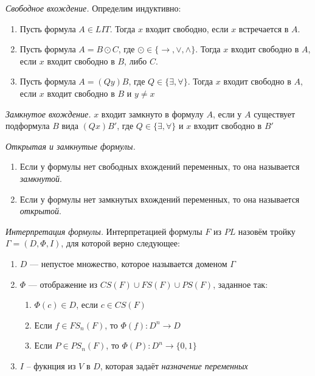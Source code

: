 \begin{definition}
  \emph{Свободное вхождение.} Определим индуктивно: 
  \begin{enumerate}
  	\item Пусть формула $A \in LIT$. Тогда $x$ входит свободно, если $x$ встречается в $A$.
    \item Пусть формула $A = B \odot C$, где $\odot \in \{ \to, \vee, \wedge \}$. Тогда $x$ входит свободно в $A$, если $x$ входит свободно в $B$, либо $C$.
    \item Пусть формула $A = (Qy)B$, где $Q \in \{ \exists, \forall \}$. Тогда $x$ входит свободно в $A$, если $x$ входит свободно в $B$ и $y \neq x$
  \end{enumerate}
\end{definition}

\begin{definition}
  \emph{Замкнутое вхождение.} $x$ входит замкнуто в формулу $A$, если у $A$ существует подформула $B$ вида $(Qx)B'$, где $Q \in \{ \exists, \forall \}$ и $x$ входит свободно в $B'$
\end{definition}

\begin{definition}
  \emph{Открытая и замкнутые формулы.}
    \begin{enumerate}
      \item Если у формулы нет свободных вхождений переменных, то она называется \textit{замкнутой}.
      \item Если у формулы нет замкнутых вхождений переменных, то она называется \textit{открытой}.
    \end{enumerate}
\end{definition}

\begin{definition}
  \emph{Интерпретация формулы.} Интерпретацией формулы $F$ из $PL$ назовём тройку $\Gamma = (D, \Phi, I)$, для которой верно следующее:
    \begin{enumerate}
		\item $D$ --- непустое множество, которое называется доменом $\Gamma$
        \item $\Phi$ --- отображение из $CS(F) \cup FS(F) \cup PS(F)$, заданное так:
          \begin{enumerate}
              \item $\Phi(c) \in D$, если $c \in CS(F)$
              \item Если $f \in FS_n(F)$, то $\Phi(f) : D^n \rightarrow D$
              \item Если $P \in PS_n(F)$, то $\Phi(P) : D^n \rightarrow \{ 0, 1 \}$
          \end{enumerate}
        \item $I$ -- фукнция из $V$ в $D$, которая задаёт \textit{назначение переменных}
    \end{enumerate}

\end{definition}


